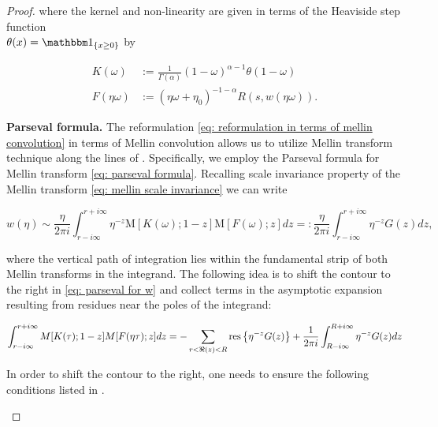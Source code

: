 \documentclass[12pt,twoside]{article}
\theoremstyle{plain}
\theoremstyle{plain}
\theoremstyle{definition}
\theoremstyle{remark}
\numberwithin{equation}{section}
\begin{document}
\begin{proof}
\vspace{5pt}

where the kernel and non-linearity are given in terms of the Heaviside step function \\ $\theta(x) = \mathbbm 1_{\{x\geq 0\}}$ by

\begin{equation}
\label{eq: kernel and non-linearity in reformulated equation}
\begin{aligned}
K(\omega) &:= \frac{1}{\Gamma(\alpha)}(1-\omega)^{\alpha-1}\theta(1-\omega)\\[10pt]
F(\eta\omega) &:= (\eta\omega + \eta_0)^{-1-\alpha} R(s, w(\eta \omega)).
\end{aligned}
\end{equation}

\textbf{Parseval formula.} The reformulation \eqref{eq: reformulation in terms of mellin convolution} in terms of Mellin convolution allows us to utilize Mellin transform technique along the lines of \cite{BH75}. Specifically, we employ the Parseval formula for Mellin transform \eqref{eq: parseval formula}. Recalling scale invariance property of the Mellin transform \eqref{eq: mellin scale invariance} we can write

\begin{equation}
\label{eq: parseval for w}
w(\eta) \sim \frac{\eta}{2 \pi i} \int_{r-i \infty}^{r+i \infty} \eta^{-z} \mathrm{M}[K(\omega) ; 1-z] \mathrm{M}[F(\omega) ; z] d z =: \frac{\eta}{2 \pi i} \int_{r-i \infty}^{r+i \infty} \eta^{-z}G(z)dz,
\end{equation}

where the vertical path of integration lies within the fundamental strip of both Mellin transforms in the integrand. The following idea is to shift the contour to the right in \eqref{eq: parseval for w} and collect terms in the asymptotic expansion resulting from residues near the poles of the integrand:

\begin{equation}
\footnotesize
\label{eq: collecting poles}
\int_{r-i \infty}^{r+i \infty} M[K(\tau) ; 1-z] M[F(\eta \tau) ; z] d z = -\sum_{r<\Re(z)<R} \operatorname{res}\left\{\eta^{-z} G(z)\right\} +\frac{1}{2 \pi i} \int_{R-i \infty}^{R+i \infty} \eta^{-z} G(z) d z
\end{equation}

In order to shift the contour to the right, one needs to ensure the following conditions listed in \cite{BH75}.

\begin{enumerate}[(A)]


\end{enumerate}
\end{proof}
\end{document}
